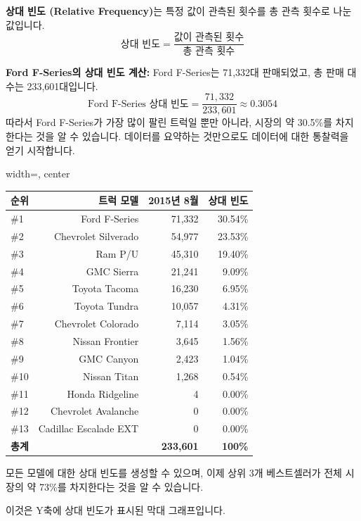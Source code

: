 \documentclass[11pt,a4paper]{article}
\theoremstyle{definition}
\begin{document}
\begin{tcolorbox}[title={상대 빈도 분포 (Relative Frequency Distribution)}]
\textbf{상대 빈도 (Relative Frequency)}는 특정 값이 관측된 횟수를 총 관측 횟수로 나눈 값입니다.
\[ \text{상대 빈도} = \frac{\text{값이 관측된 횟수}}{\text{총 관측 횟수}} \]

\begin{examplebox}
\textbf{Ford F-Series의 상대 빈도 계산:}
Ford F-Series는 71,332대 판매되었고, 총 판매 대수는 233,601대입니다.
\[ \text{Ford F-Series 상대 빈도} = \frac{71,332}{233,601} \approx 0.3054 \]
따라서 Ford F-Series가 가장 많이 팔린 트럭일 뿐만 아니라, 시장의 약 30.5\%를 차지한다는 것을 알 수 있습니다. 데이터를 요약하는 것만으로도 데이터에 대한 통찰력을 얻기 시작합니다.
\end{examplebox}

\begin{center}
\label{tab:pickup_trucks_relative_freq}
\begin{adjustbox}{width=\textwidth, center}
\begin{tabular}{lrrr}
\toprule
\textbf{순위} & \textbf{트럭 모델} & \textbf{2015년 8월} & \textbf{상대 빈도} \\
\midrule
\#1 & Ford F-Series & 71,332 & 30.54\% \\
\#2 & Chevrolet Silverado & 54,977 & 23.53\% \\
\#3 & Ram P/U & 45,310 & 19.40\% \\
\#4 & GMC Sierra & 21,241 & 9.09\% \\
\#5 & Toyota Tacoma & 16,230 & 6.95\% \\
\#6 & Toyota Tundra & 10,057 & 4.31\% \\
\#7 & Chevrolet Colorado & 7,114 & 3.05\% \\
\#8 & Nissan Frontier & 3,645 & 1.56\% \\
\#9 & GMC Canyon & 2,423 & 1.04\% \\
\#10 & Nissan Titan & 1,268 & 0.54\% \\
\#11 & Honda Ridgeline & 4 & 0.00\% \\
\#12 & Chevrolet Avalanche & 0 & 0.00\% \\
\#13 & Cadillac Escalade EXT & 0 & 0.00\% \\
\midrule
\textbf{총계} & & \textbf{233,601} & \textbf{100\%} \\
\bottomrule
\end{tabular}
\end{adjustbox}
\end{center}
모든 모델에 대한 상대 빈도를 생성할 수 있으며, 이제 상위 3개 베스트셀러가 전체 시장의 약 73\%를 차지한다는 것을 알 수 있습니다.

\begin{center}
\label{fig:bar_graph_relative_freq}
\end{center}
이것은 Y축에 상대 빈도가 표시된 막대 그래프입니다.
\end{tcolorbox}
\end{document}
